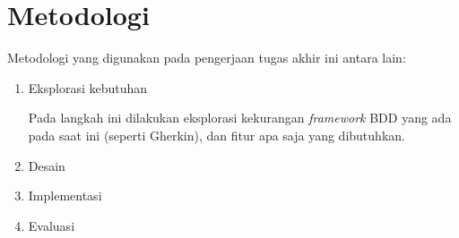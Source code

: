 \section{Metodologi}

Metodologi yang digunakan pada pengerjaan tugas akhir ini antara lain:

\begin{enumerate}
    \item Eksplorasi kebutuhan

    Pada langkah ini dilakukan eksplorasi kekurangan \textit{framework} BDD yang ada pada saat ini
    (seperti Gherkin), dan fitur apa saja yang dibutuhkan.

    \item Desain 
    \item Implementasi 
    \item Evaluasi
\end{enumerate}
